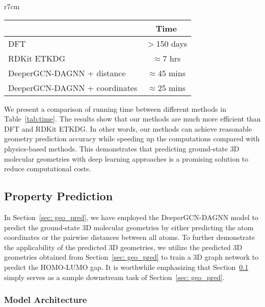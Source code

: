 \documentclass{article}
\begin{document}
\begin{wraptable}[10]{r}{7cm}\vspace{-0.4cm}
    \small
    \centering
    \caption{Time needed to predict 3D geometries over the entire test set. We time until coordinates are obtained.}
    \addtolength{\tabcolsep}{-5pt}
    \begin{tabular}{lc}
    \toprule
    & Time \\
    \midrule
    DFT & $>$150 days \\
    RDKit ETKDG & $\approx$7 hrs \\
DeeperGCN-DAGNN + distance & $\approx$45 mins \\
    DeeperGCN-DAGNN + coordinates & $\approx$25 mins \\
    \bottomrule
    \end{tabular}
    \label{tab:time}
\end{wraptable}

We present a comparison of running time between different methods in Table~\ref{tab:time}. The results show that our methods are much more efficient than DFT and RDKit ETKDG. In other words, our methods can achieve reasonable geometry prediction accuracy while speeding up the computations compared with physics-based methods. This demonstrates that predicting ground-state 3D molecular geometries with deep learning approaches is a promising solution to reduce computational costs.



\subsection{Property Prediction}
\label{sec:prop_pred}


In Section~\ref{sec: geo_pred}, we have employed the DeeperGCN-DAGNN model to predict the ground-state 3D molecular geometries by either predicting the atom coordinates or the pairwise distances between all atoms. To further demonstrate the applicability of the predicted 3D geometries, we utilize the predicted 3D geometries obtained from Section~\ref{sec: geo_pred} to train a 3D graph network to predict the HOMO-LUMO gap. It is worthwhile emphasizing that Section~\ref{sec:prop_pred} simply serves as a sample downstream task of Section~\ref{sec: geo_pred}.

\subsubsection{Model Architecture}
\end{document}
